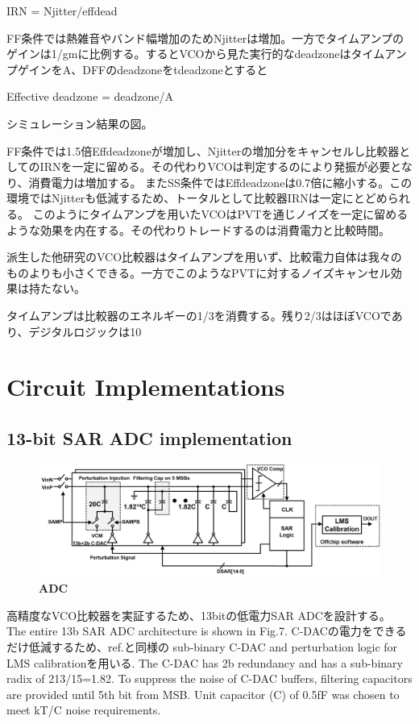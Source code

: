 \documentclass[letterpaper, 10 pt, conference]{ieeeconf}  %
\begin{document}
IRN = Njitter/effdead

FF条件では熱雑音やバンド幅増加のためNjitterは増加。一方でタイムアンプのゲインは1/gmに比例する。するとVCOから見た実行的なdeadzoneはタイムアンプゲインをA、DFFのdeadzoneをtdeadzoneとすると

Effective deadzone = deadzone/A

シミュレーション結果の図。

FF条件では1.5倍Effdeadzoneが増加し、Njitterの増加分をキャンセルし比較器としてのIRNを一定に留める。その代わりVCOは判定するのにより発振が必要となり、消費電力は増加する。
またSS条件ではEffdeadzoneは0.7倍に縮小する。この環境ではNjitterも低減するため、トータルとして比較器IRNは一定にとどめられる。
このようにタイムアンプを用いたVCOはPVTを通じノイズを一定に留めるような効果を内在する。その代わりトレードするのは消費電力と比較時間。

派生した他研究のVCO比較器はタイムアンプを用いず、比較電力自体は我々のものよりも小さくできる。一方でこのようなPVTに対するノイズキャンセル効果は持たない。

タイムアンプは比較器のエネルギーの1/3を消費する。残り2/3はほぼVCOであり、デジタルロジックは10%

\section{Circuit Implementations}
\subsection{13-bit SAR ADC implementation}

\begin{figure}[ht!]
\centering
 \includegraphics[width=1\textwidth]{figs/fig7.png}
  \captionsetup{font=footnotesize}
  \caption{\textbf{ADC}}
  \label{highlight}
\end{figure}

高精度なVCO比較器を実証するため、13bitの低電力SAR ADCを設計する。
The entire 13b SAR ADC architecture is shown in Fig.7. C-DACの電力をできるだけ低減するため、ref.\cite{liu201012b}と同様の sub-binary C-DAC and perturbation logic for LMS calibrationを用いる. The C-DAC has 2b redundancy and has a sub-binary radix of 213/15=1.82. To suppress the noise of C-DAC buffers, filtering capacitors \cite{miki20154} are provided until 5th bit from MSB. Unit capacitor (C) of 0.5fF was chosen  to meet kT/C noise requirements.
\end{document}
